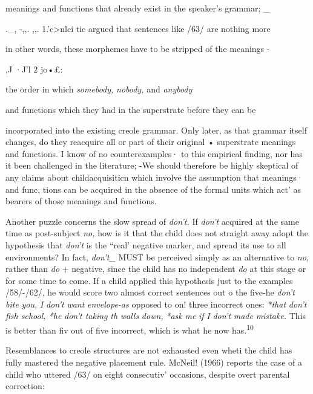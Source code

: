 
meanings and functions that already exist in the speaker's grammar; \_

.\_, -,,. ,,. 1.'c{\textgreater}nlci tie argued that sentences like /63/ are nothing more

in other words, these morphemes have to be stripped of the meanings -

,J ·J'l 2 jo•£:

the order in which \textit{somebody,} \textit{nobody,} and \textit{anybody}

and functions which they had in the superstrate before they can be

incorporated into the existing creole grammar. Only later, as that grammar itself changes, do they reacquire all or part of their original • superstrate meanings and functions. I know of no counterexamples· to this empirical finding, nor has it been challenged in the literature; -\-We should therefore be highly skeptical of any claims about child\-acquisiticn which involve the assumption that meanings· and func, tions can be acquired in the absence of the formal units which act' as bearers of those meanings and functions.

Another puzzle concerns the slow spread of \textit{don't.} If \textit{don't} acquired at the same time as post-subject \textit{no,} how is it that the child does not straight away adopt the hypothesis that \textit{don't }is the ``real' negative marker, and spread its use to all environments? In fact, \textit{don't\_} MUST be perceived simply as an alternative to \textit{no,} rather than \textit{do} + negative, since the child has no independent \textit{do} at this stage or for some time to come. If a child applied this hypothesis just to the exam\-ples /58/-/62/, he would score two almost correct sentences out o the five-he \textit{don't} \textit{bite} \textit{you,} \textit{I} \textit{don't} \textit{want} \textit{envelope-as} opposed to on! three incorrect ones: \textit{*that} \textit{don't} \textit{fish school, *he} \textit{don't taki}\textit{n}\textit{g} \textit{th} \textit{walls} \textit{down,} \textit{*ask} \textit{me} \textit{if} \textit{I} \textit{don't} \textit{made} \textit{mistake.} This is better than fiv out of five incorrect, which is what he now has.\textsuperscript{10}

Resemblances to creole structures are not exhausted even wheti the child has fully mastered the negative placement rule. McNeil! (1966) reports the case of a child who uttered /63/ on eight consecutiv' occasions, despite overt parental correction:

